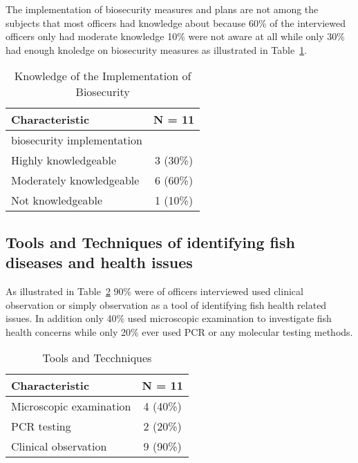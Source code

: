 \documentclass[
  letterpaper,
  DIV=11,
  numbers=noendperiod]{scrartcl}
\begin{document}
The implementation of biosecurity measures and plans are not among the
subjects that most officers had knowledge about because 60\% of the
interviewed officers only had moderate knowledge 10\% were not aware at
all while only 30\% had enough knoledge on biosecurity measures as
illustrated in Table~\ref{tbl-biosecurity}.

\begin{longtable}[]{@{}lc@{}}

\caption{\label{tbl-biosecurity}Knowledge of the Implementation of
Biosecurity}

\tabularnewline

\toprule\noalign{}
\textbf{Characteristic} & \textbf{N = 11} \\
\midrule\noalign{}
\endhead
\bottomrule\noalign{}
\endlastfoot
biosecurity implementation & \\
Highly knowledgeable & 3 (30\%) \\
Moderately knowledgeable & 6 (60\%) \\
Not knowledgeable & 1 (10\%) \\

\end{longtable}

\subsection{Tools and Techniques of identifying fish diseases and health
issues}\label{tools-and-techniques-of-identifying-fish-diseases-and-health-issues}

As illustrated in Table~\ref{tbl-tools} 90\% were of officers
interviewed used clinical observation or simply observation as a tool of
identifying fish health related issues. In addition only 40\% used
microscopic examination to investigate fish health concerns while only
20\% ever used PCR or any molecular testing methods.

\begin{longtable}[]{@{}lc@{}}

\caption{\label{tbl-tools}Tools and Tecchniques}

\tabularnewline

\toprule\noalign{}
\textbf{Characteristic} & \textbf{N = 11} \\
\midrule\noalign{}
\endhead
\bottomrule\noalign{}
\endlastfoot
Microscopic examination & 4 (40\%) \\
PCR testing & 2 (20\%) \\
Clinical observation & 9 (90\%) \\

\end{longtable}
\end{document}
